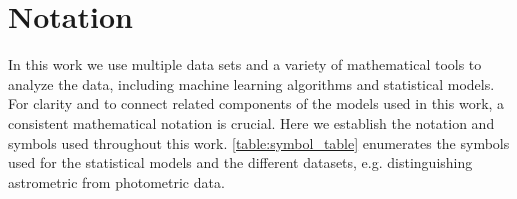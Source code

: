 \documentclass[twocolumn]{aastex631}
\begin{document}




\appendix

\section{Notation} \label{app:notation}

    In this work we use multiple data sets and a variety of mathematical tools to analyze the data, including machine learning algorithms and statistical models.
    For clarity and to connect related components of the models used in this work, a consistent mathematical notation is crucial. Here we establish the notation and symbols used throughout this work.
    \autoref{table:symbol_table} enumerates the symbols used for the statistical models and the different datasets, e.g. distinguishing astrometric from photometric data. 
\end{document}
